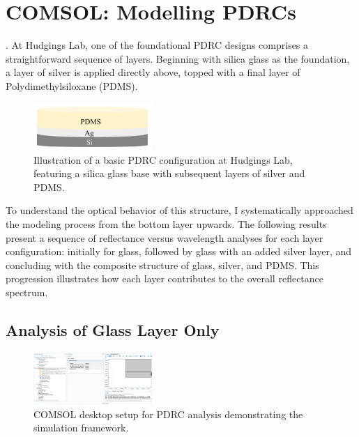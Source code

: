 \section{COMSOL: Modelling PDRCs}.
At Hudgings Lab, one of the foundational PDRC designs comprises a straightforward sequence of layers. Beginning with silica glass as the foundation, a layer of silver is applied directly above, topped with a final layer of Polydimethylsiloxane (PDMS).

\begin{figure}[ht!]
  \centering
  \includegraphics[width=0.4\textwidth]{Chapters/Figures/Chapter 4 Figures/PDRC Layout.png}
  \caption{Illustration of a basic PDRC configuration at Hudgings Lab, featuring a silica glass base with subsequent layers of silver and PDMS.}
  \label{fig:PDRC-configuration-Hudgings-Lab}
\end{figure}

To understand the optical behavior of this structure, I systematically approached the modeling process from the bottom layer upwards. The following results present a sequence of reflectance versus wavelength analyses for each layer configuration: initially for glass, followed by glass with an added silver layer, and concluding with the composite structure of glass, silver, and PDMS. This progression illustrates how each layer contributes to the overall reflectance spectrum.

\subsection{Analysis of Glass Layer Only}

\begin{figure}[ht!]
  \centering
  \includegraphics[width=0.4\textwidth]{Chapters/Figures/Chapter 4 Figures/COMSOL Desktop Layout for PDRC Analysis.png}
  \caption{COMSOL desktop setup for PDRC analysis demonstrating the simulation framework.}
  \label{fig:COMSOL-desktop-PDRC-setup}
\end{figure}

